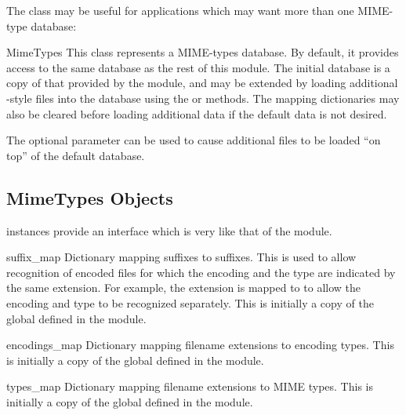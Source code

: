 The  class may be useful for applications which may
want more than one MIME-type database:

\begin{classdesc}{MimeTypes}{}
  This class represents a MIME-types database.  By default, it
  provides access to the same database as the rest of this module.
  The initial database is a copy of that provided by the module, and
  may be extended by loading additional -style files
  into the database using the  or 
  methods.  The mapping dictionaries may also be cleared before
  loading additional data if the default data is not desired.

  The optional  parameter can be used to cause
  additional files to be loaded ``on top'' of the default database.

\end{classdesc}


\subsection{MimeTypes Objects \label{mimetypes-objects}}

 instances provide an interface which is very like
that of the  module.

\begin{datadesc}{suffix_map}
  Dictionary mapping suffixes to suffixes.  This is used to allow
  recognition of encoded files for which the encoding and the type are
  indicated by the same extension.  For example, the 
  extension is mapped to  to allow the encoding and type
  to be recognized separately.  This is initially a copy of the global
   defined in the module.
\end{datadesc}

\begin{datadesc}{encodings_map}
  Dictionary mapping filename extensions to encoding types.  This is
  initially a copy of the global  defined in the
  module.
\end{datadesc}

\begin{datadesc}{types_map}
  Dictionary mapping filename extensions to MIME types.  This is
  initially a copy of the global  defined in the
  module.
\end{datadesc}

